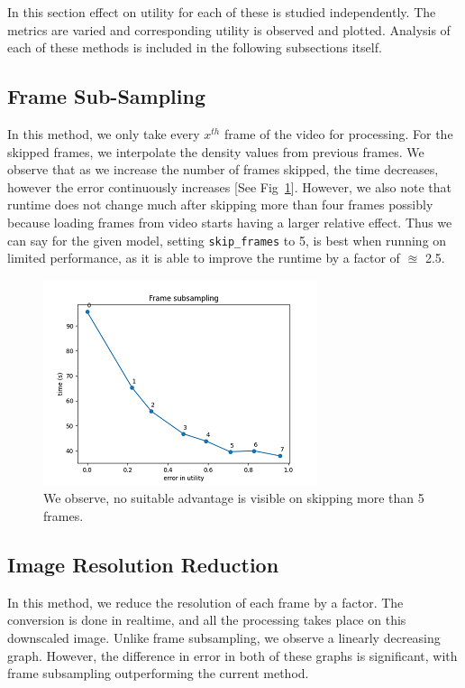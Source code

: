 \documentclass[conference]{IEEEtran}
\begin{document}
In this section effect on utility for each of these is studied independently. The metrics are varied and corresponding
utility is observed and plotted. Analysis of each of these methods is included in the following subsections itself.

\subsection{Frame Sub-Sampling}

In this method, we only take every $x^{th}$ frame of the video for processing. For the skipped frames, we interpolate the density values from previous frames. We observe that as we increase the number of frames skipped, the time decreases, however the error continuously increases [See Fig~\ref{skf_evt}].
However, we also note that runtime does not change much after skipping more than four frames possibly because loading frames from video starts having a larger relative effect.
Thus we can say for the given model, setting \verb|skip_frames| to 5, is best
when running on limited performance, as it is able to improve the runtime by a factor of $\approxeq$ 2.5.

\begin{figure}[htbp]
    \centerline{\includegraphics{plots/plot_skip_frames.png}}
    \caption{We observe, no suitable advantage is visible on skipping more than 5 frames.}
    \label{skf_evt}
\end{figure}


\subsection{Image Resolution Reduction}

In this method, we reduce the resolution of each frame by a factor. The conversion is done in realtime, and all the processing takes place on this downscaled image.
Unlike frame subsampling, we observe a linearly decreasing graph. However, the difference in error in both of these graphs is significant, with frame subsampling outperforming the current method.
\end{document}
